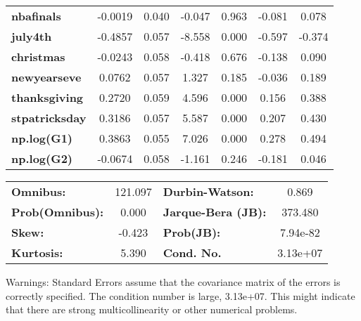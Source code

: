 \begin{center}
\begin{tabular}{lcccccc}
\textbf{nbafinals}                         &      -0.0019  &        0.040     &    -0.047  &         0.963        &       -0.081    &        0.078     \\
\textbf{july4th}                           &      -0.4857  &        0.057     &    -8.558  &         0.000        &       -0.597    &       -0.374     \\
\textbf{christmas}                         &      -0.0243  &        0.058     &    -0.418  &         0.676        &       -0.138    &        0.090     \\
\textbf{newyearseve}                       &       0.0762  &        0.057     &     1.327  &         0.185        &       -0.036    &        0.189     \\
\textbf{thanksgiving}                      &       0.2720  &        0.059     &     4.596  &         0.000        &        0.156    &        0.388     \\
\textbf{stpatricksday}                     &       0.3186  &        0.057     &     5.587  &         0.000        &        0.207    &        0.430     \\
\textbf{np.log(G1)}                        &       0.3863  &        0.055     &     7.026  &         0.000        &        0.278    &        0.494     \\
\textbf{np.log(G2)}                        &      -0.0674  &        0.058     &    -1.161  &         0.246        &       -0.181    &        0.046     \\
\bottomrule
\end{tabular}
\begin{tabular}{lclc}
\textbf{Omnibus:}       & 121.097 & \textbf{  Durbin-Watson:     } &    0.869  \\
\textbf{Prob(Omnibus):} &   0.000 & \textbf{  Jarque-Bera (JB):  } &  373.480  \\
\textbf{Skew:}          &  -0.423 & \textbf{  Prob(JB):          } & 7.94e-82  \\
\textbf{Kurtosis:}      &   5.390 & \textbf{  Cond. No.          } & 3.13e+07  \\
\bottomrule
\end{tabular}
\end{center}

Warnings: \newline
 [1] Standard Errors assume that the covariance matrix of the errors is correctly specified. \newline
 [2] The condition number is large, 3.13e+07. This might indicate that there are \newline
 strong multicollinearity or other numerical problems.